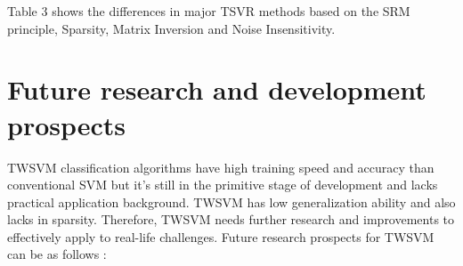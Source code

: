 \documentclass[pdflatex,sn-mathphys]{sn-jnl}%
\theoremstyle{thmstyleone}%
\theoremstyle{thmstyletwo}%
\theoremstyle{thmstylethree}%
\begin{document}
\hspace*{-2.5cm}
\begin{table}%
\caption {Properties of different TSVR Algorithms} \label{tab:titleee}
\end{table}

Table 3 shows the differences in major TSVR methods based on the SRM principle, Sparsity, Matrix Inversion and Noise Insensitivity.

\section{Future research and development prospects}
\label{sec:Future research and development prospects}

TWSVM classification algorithms have high training speed and accuracy than conventional SVM but it's still in the primitive stage of development and lacks practical application background. TWSVM has low generalization ability and also lacks in sparsity. Therefore, TWSVM needs further research and improvements to effectively apply to real-life challenges. Future research prospects for TWSVM  can be as follows :
\end{document}
